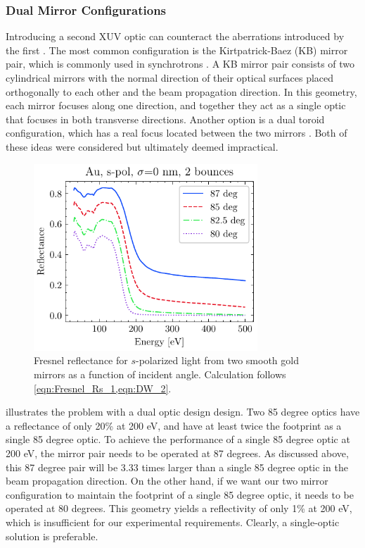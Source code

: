 \subsubsection{Dual Mirror Configurations}

Introducing a second XUV optic can counteract the aberrations introduced by the first \cite{howellsMirrorsSynchrotronRadiationBeamlines1994}. The most common configuration is the Kirtpatrick-Baez (KB) mirror pair, which is commonly used in synchrotrons \cite{kirkpatrickFormationOpticalImages1948}. A KB mirror pair consists of two cylindrical mirrors with the normal direction of their optical surfaces placed orthogonally to each other and the beam propagation direction. In this geometry, each mirror focuses along one direction, and together they act as a single optic that focuses in both transverse directions. Another option is a dual toroid configuration, which has a real focus located between the two mirrors \cite{polettoMicrofocusingAttosecondPulses2013}. Both of these ideas were considered but ultimately deemed impractical.

\begin{figure}
	\centering
	\includegraphics[width=0.75\textwidth]{figures/chap2/Au_ReflvsAngle_2bounce.pdf}
	\caption{Fresnel reflectance for $s$-polarized light from two smooth gold mirrors as a function of incident angle. Calculation follows \cref{eqn:Fresnel_Rs_1,eqn:DW_2}.}
	\label{fig:Au_ReflvsAngle_2bounce}
\end{figure}

 illustrates the problem with a dual optic design design. Two 85 degree optics have a reflectance of only 20\% at 200 eV, and have at least twice the footprint as a single 85 degree optic. To achieve the performance of a single 85 degree optic at 200 eV, the mirror pair needs to be operated at 87 degrees. As discussed above, this 87 degree pair will be 3.33 times larger than a single 85 degree optic in the beam propagation direction. On the other hand, if we want our two mirror configuration to maintain the footprint of a single 85 degree optic, it needs to be operated at 80 degrees. This geometry yields a reflectivity of only 1\% at 200 eV, which is insufficient for our experimental requirements. Clearly, a single-optic solution is preferable.

